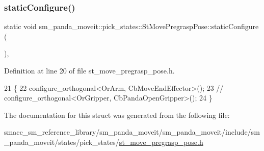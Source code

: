 \subsubsection{\texorpdfstring{static\+Configure()}{staticConfigure()}}
{\footnotesize\ttfamily static void sm\+\_\+panda\+\_\+moveit\+::pick\+\_\+states\+::\+St\+Move\+Pregrasp\+Pose\+::static\+Configure (\begin{DoxyParamCaption}{ }\end{DoxyParamCaption})\hspace{0.3cm}{\ttfamily [inline]}, {\ttfamily [static]}}



Definition at line 20 of file st\+\_\+move\+\_\+pregrasp\+\_\+pose.\+h.


\begin{DoxyCode}
21     \{
22         configure\_orthogonal<OrArm, CbMoveEndEffector>();
23         \textcolor{comment}{// configure\_orthogonal<OrGripper, CbPandaOpenGripper>();}
24     \}
\end{DoxyCode}


The documentation for this struct was generated from the following file\+:\begin{DoxyCompactItemize}
\item 
smacc\+\_\+sm\+\_\+reference\+\_\+library/sm\+\_\+panda\+\_\+moveit/sm\+\_\+panda\+\_\+moveit/include/sm\+\_\+panda\+\_\+moveit/states/pick\+\_\+states/\hyperlink{sm__panda__moveit_2sm__panda__moveit_2include_2sm__panda__moveit_2states_2pick__states_2st__move__pregrasp__pose_8h}{st\+\_\+move\+\_\+pregrasp\+\_\+pose.\+h}\end{DoxyCompactItemize}
